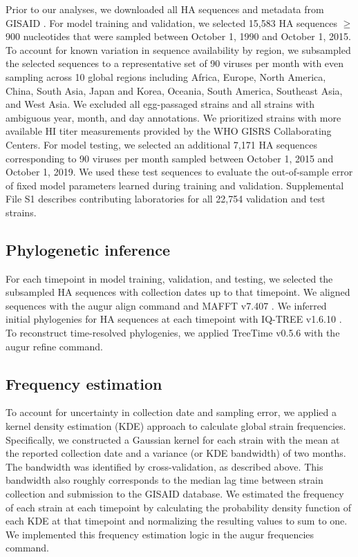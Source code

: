 Prior to our analyses, we downloaded all HA sequences and metadata from GISAID \citep{shu2017gisaid}.
For model training and validation, we selected 15,583 HA sequences $\geq$900 nucleotides that were sampled between October 1, 1990 and October 1, 2015.
To account for known variation in sequence availability by region, we subsampled the selected sequences to a representative set of 90 viruses per month with even sampling across 10 global regions including Africa, Europe, North America, China, South Asia, Japan and Korea, Oceania, South America, Southeast Asia, and West Asia.
We excluded all egg-passaged strains and all strains with ambiguous year, month, and day annotations.
We prioritized strains with more available HI titer measurements provided by the WHO GISRS Collaborating Centers.
For model testing, we selected an additional 7,171 HA sequences corresponding to 90 viruses per month sampled between October 1, 2015 and October 1, 2019.
We used these test sequences to evaluate the out-of-sample error of fixed model parameters learned during training and validation.
Supplemental File S1 describes contributing laboratories for all 22,754 validation and test strains.

\subsection*{Phylogenetic inference}

For each timepoint in model training, validation, and testing, we selected the subsampled HA sequences with collection dates up to that timepoint.
We aligned sequences with the augur align command \citep{Hadfield2018} and MAFFT v7.407 \citep{Katoh2002}.
We inferred initial phylogenies for HA sequences at each timepoint with IQ-TREE v1.6.10 \citep{Nguyen2014}.
To reconstruct time-resolved phylogenies, we applied TreeTime v0.5.6 \citep{Sagulenko2018} with the augur refine command.

\subsection*{Frequency estimation}

To account for uncertainty in collection date and sampling error, we applied a kernel density estimation (KDE) approach to calculate global strain frequencies.
Specifically, we constructed a Gaussian kernel for each strain with the mean at the reported collection date and a variance (or KDE bandwidth) of two months.
The bandwidth was identified by cross-validation, as described above.
This bandwidth also roughly corresponds to the median lag time between strain collection and submission to the GISAID database.
We estimated the frequency of each strain at each timepoint by calculating the probability density function of each KDE at that timepoint and normalizing the resulting values to sum to one.
We implemented this frequency estimation logic in the augur frequencies command.

